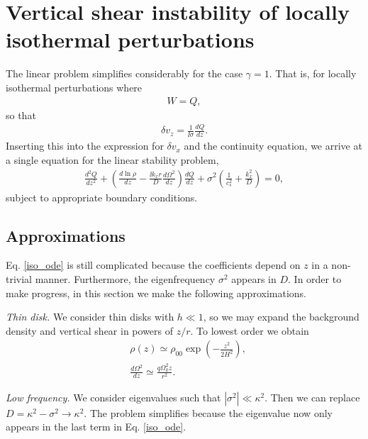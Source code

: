 \section{Vertical shear instability of locally
  isothermal perturbations}
The linear problem simplifies considerably for the case
$\gamma=1$. That is, for locally isothermal perturbations where
\begin{align}
  W=Q,
\end{align}
so that
\begin{align}
  \delta v_z = \frac{1}{\ii\sigma}\frac{dQ}{dz}. 
\end{align}
Inserting this into the expression for $\delta v_x$ and the continuity
equation, we arrive at a single equation for the linear stability
problem,
\begin{align}\label{iso_ode}
  \frac{d^2Q}{dz^2} + \left(\frac{d\ln{\rho}}{dz} - \frac{\ii k_x
      r}{D}\frac{d\Omega^2}{dz}\right) \frac{dQ}{dz} +
  \sigma^2\left(\frac{1}{c_s^2} + \frac{k_x^2}{D}\right)=0, 
\end{align} 
subject to appropriate boundary conditions. 

\subsection{Approximations}
Eq. \ref{iso_ode} is still complicated because the coefficients depend
on $z$ in a non-trivial manner. Furthermore, the eigenfrequency
$\sigma^2$ appears in $D$. In order to make progress, in this section
we make the following approximations. 

\emph{Thin disk.} We consider thin disks with $h\ll1$, so we may expand the
background density and vertical shear in powers of $z/r$. To lowest
order we obtain
\begin{align}
  &\rho(z) \simeq \rho_{00} \exp{\left(-\frac{z^2}{2H^2}\right)},\\
  &\frac{d\Omega^2}{dz} \simeq \frac{q\Omega_k^2z}{r^2}. 
\end{align}

\emph{Low frequency.} We consider eigenvalues such that
$|\sigma^2|\ll \kappa^2$. Then we can replace $D=\kappa^2 -\sigma^2\to
\kappa^2$. The problem simplifies because the eigenvalue now only
appears in the last term in Eq. \ref{iso_ode}. 


